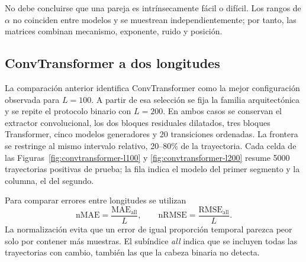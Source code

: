\documentclass[a4paper,12pt]{article}
\begin{document}
No debe concluirse que una pareja es intrínsecamente fácil o difícil. Los rangos de $\alpha$ no coinciden entre modelos y se muestrean independientemente; por tanto, las matrices combinan mecanismo, exponente, ruido y posición.

\subsection{ConvTransformer a dos longitudes}
\label{sec:convtransformer-lengths}

La comparación anterior identifica ConvTransformer como la mejor configuración observada para $L=100$. A partir de esa selección se fija la familia arquitectónica y se repite el protocolo binario con $L=200$. En ambos casos se conservan el extractor convolucional, los dos bloques residuales dilatados, tres bloques Transformer, cinco modelos generadores y 20 transiciones ordenadas. La frontera se restringe al mismo intervalo relativo, 20--80\% de la trayectoria. Cada celda de las Figuras~\ref{fig:convtransformer-l100} y \ref{fig:convtransformer-l200} resume 5000 trayectorias positivas de prueba; la fila indica el modelo del primer segmento y la columna, el del segundo.

Para comparar errores entre longitudes se utilizan
\begin{equation}
  \mathrm{nMAE}=\frac{\mathrm{MAE}_{\mathrm{all}}}{L},
  \qquad
  \mathrm{nRMSE}=\frac{\mathrm{RMSE}_{\mathrm{all}}}{L}.
  \label{eq:normalized-localization-errors}
\end{equation}
La normalización evita que un error de igual proporción temporal parezca peor solo por contener más muestras. El subíndice \emph{all} indica que se incluyen todas las trayectorias con cambio, también las que la cabeza binaria no detecta.

\begin{table}[htbp]
\centering
\scriptsize
{}
\caption{ConvTransformer en los conjuntos de prueba de longitudes 100 y 200. Los errores no normalizados se expresan en muestras.}
\label{tab:convtransformer-lengths}
\end{table}
\end{document}

